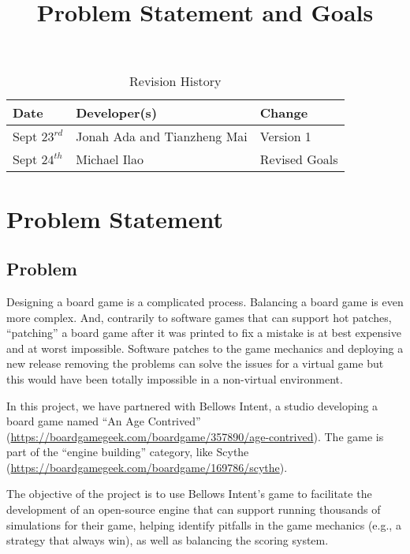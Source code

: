 \documentclass{article}
\title{Problem Statement and Goals\\\progname}
\author{\authname}
\date{}
\begin{document}
\begin{table}[hp]
\caption{Revision History} \label{TblRevisionHistory}
\begin{tabularx}{\textwidth}{llX}
\toprule
\textbf{Date} & \textbf{Developer(s)} & \textbf{Change}\\
\midrule
Sept $23^{rd}$ & Jonah Ada and Tianzheng Mai & Version 1\\
Sept $24^{th}$ & Michael Ilao & Revised Goals\\
\bottomrule
\end{tabularx}
\end{table}

\newpage

\maketitle



\section{Problem Statement}



\subsection{Problem}
\indent Designing a board game is a complicated process.
Balancing a board game is even more complex. And, contrarily to software games
that can support hot patches, ``patching'' a board game after it was printed to
fix a mistake is at best expensive and at worst impossible.
Software patches to the game mechanics and deploying a new release removing the problems can solve the issues for a virtual game but this would have been totally impossible in a
non-virtual environment.


In this project, we have partnered with Bellows Intent, a studio developing a
board game named ``An Age Contrived''
(\url{https://boardgamegeek.com/boardgame/357890/age-contrived}). The game is
part of the ``engine building'' category, like Scythe
(\url{https://boardgamegeek.com/boardgame/169786/scythe}). 

The objective of the project is to use Bellows Intent's game to facilitate the development of an open-source engine that can support running thousands of simulations for their game, helping identify
pitfalls in the game mechanics (e.g., a strategy that always win), as well as
balancing the scoring system. 
\end{document}
